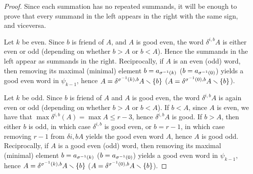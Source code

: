 \begin{proof}
	Since each summation has no repeated summands, it will be enough to prove that every summand in the left appears in the right with the same sign, and viceversa.


	Let $k$ be even. Since $b$ is friend of $A$, and $A$ is good even, the word $\delta^{i,b}A$ is either even or odd (depending on whether $b>A$ or $b<A$). Hence the summands in the left appear as summands in the right. Reciprocally, if $A$ is an even (odd) word, then removing its maximal (minimal) element $b=a_{{\sigma^{-1}(k)}}$ ($b=a_{{\sigma^{-1}(0)}}$) yields a good even word in $\psi_{k-1}$, hence $A = \delta^{{\sigma^{-1}(k)},b}A\smallsetminus\{b\}$ ($A = \delta^{{\sigma^{-1}(0)},b}A\smallsetminus\{b\}$).

	Let $k$ be odd. Since $b$ is friend of $A$ and $A$ is good even, the word $\delta^{i,b}A$ is again even or odd (depending on whether $b>A$ or $b<A$). If $b<A$, since $A$ is even, we have that $\max \delta^{i,b}(A) = \max A \leq r-3$, hence $\delta^{i,b}A$ is good. If $b>A$, then either $b$ is odd, in which case $\delta^{i,b}$ is good even, or $b=r-1$, in which case removing $r-1$ from $\delta{i,b}A$ yields the good even word $A$, hence $A$ is good odd. Reciprocally, if $A$ is a good even (odd) word, then removing its maximal (minimal) element $b=a_{{\sigma^{-1}(k)}}$ ($b=a_{{\sigma^{-1}(0)}}$) yields a good even word in $\psi_{k-1}$, hence $A = \delta^{{\sigma^{-1}(k)},b}A\smallsetminus\{b\}$ ($A = \delta^{{\sigma^{-1}(0)},b}A\smallsetminus\{b\}$).




\end{proof}
